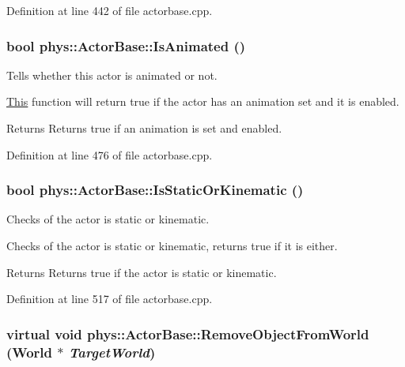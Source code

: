 Definition at line 442 of file actorbase.cpp.

\hypertarget{classphys_1_1ActorBase_ac98f9fdae0da939e352f8fcff217457c}{
\subsubsection[{IsAnimated}]{\setlength{\rightskip}{0pt plus 5cm}bool phys::ActorBase::IsAnimated ()}}
\label{d8/d0f/classphys_1_1ActorBase_ac98f9fdae0da939e352f8fcff217457c}


Tells whether this actor is animated or not. 

\hyperlink{structThis}{This} function will return true if the actor has an animation set and it is enabled. \begin{DoxyReturn}{Returns}
Returns true if an animation is set and enabled. 
\end{DoxyReturn}


Definition at line 476 of file actorbase.cpp.

\hypertarget{classphys_1_1ActorBase_a0758873d315a0f70871649493d78d739}{
\subsubsection[{IsStaticOrKinematic}]{\setlength{\rightskip}{0pt plus 5cm}bool phys::ActorBase::IsStaticOrKinematic ()}}
\label{d8/d0f/classphys_1_1ActorBase_a0758873d315a0f70871649493d78d739}


Checks of the actor is static or kinematic. 

Checks of the actor is static or kinematic, returns true if it is either. \begin{DoxyReturn}{Returns}
Returns true if the actor is static or kinematic. 
\end{DoxyReturn}


Definition at line 517 of file actorbase.cpp.

\hypertarget{classphys_1_1ActorBase_aaa787de7ec5d7d1d8428ea78f37bcb40}{
\subsubsection[{RemoveObjectFromWorld}]{\setlength{\rightskip}{0pt plus 5cm}virtual void phys::ActorBase::RemoveObjectFromWorld ({\bf World} $\ast$ {\em TargetWorld})}}
\label{d8/d0f/classphys_1_1ActorBase_aaa787de7ec5d7d1d8428ea78f37bcb40}


